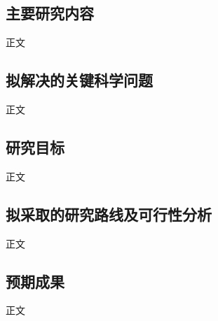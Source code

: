 \subsection{主要研究内容}\label{PlanSubsec:Content}
正文

\subsection{拟解决的关键科学问题}\label{PlanSubsec:SciQuestions}
正文
\subsection{研究目标}\label{PlanSubsec:Goal}
正文


\subsection{拟采取的研究路线及可行性分析}\label{PlanSubsec:Availability}
正文

\subsection{预期成果}\label{PlanSubsec:Results}
正文


